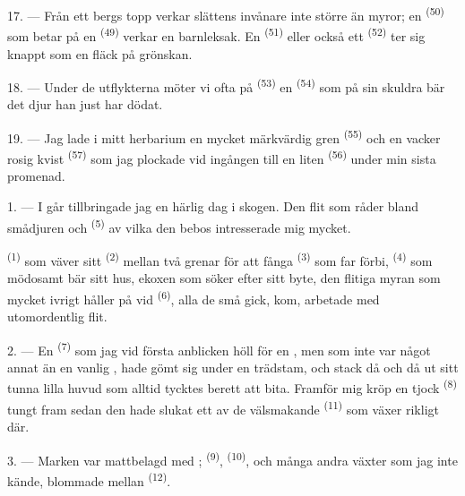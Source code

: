17. --- Från ett bergs topp verkar slättens invånare inte större än myror; en
 \textsuperscript{(50)} som betar på en 
\textsuperscript{(49)} verkar en barnleksak. En 
\textsuperscript{(51)} eller också ett 
\textsuperscript{(52)} ter sig knappt som en fläck på grönskan.

18. --- Under de utflykterna möter vi ofta på 
\textsuperscript{(53)} en  \textsuperscript{(54)} som på sin
skuldra bär det djur han just har dödat.

19. --- Jag lade i mitt herbarium en mycket märkvärdig gren 
\textsuperscript{(55)} och en vacker rosig kvist 
\textsuperscript{(57)} som jag plockade vid ingången till en liten
 \textsuperscript{(56)} under min sista promenad.

\VUsaut{3.0mm}
\VUsaut{3.0mm}

\VUsaut{3.0mm}

1. --- I går tillbringade jag en härlig dag i skogen. Den flit som råder bland
smådjuren och  \textsuperscript{(5)} av vilka den bebos
intresserade mig mycket.

 \textsuperscript{(1)} som väver sitt 
\textsuperscript{(2)} mellan två grenar för att fånga 
\textsuperscript{(3)} som far förbi,  \textsuperscript{(4)} som
mödosamt bär sitt hus, ekoxen som söker efter sitt byte, den flitiga myran som
mycket ivrigt håller på vid  \textsuperscript{(6)}, alla de
små gick, kom, arbetade med utomordentlig flit.

2. --- En  \textsuperscript{(7)} som jag vid första anblicken höll
för en , men som inte var något annat än en vanlig
, hade gömt sig under en trädstam, och stack då och då ut sitt tunna
lilla huvud som alltid tycktes berett att bita. Framför mig kröp en tjock
 \textsuperscript{(8)} tungt fram sedan den hade slukat ett av de
välsmakande  \textsuperscript{(11)} som växer rikligt där.

3. --- Marken var mattbelagd med ; 
\textsuperscript{(9)},  \textsuperscript{(10)}, och många
andra växter som jag inte kände, blommade mellan 
\textsuperscript{(12)}.

